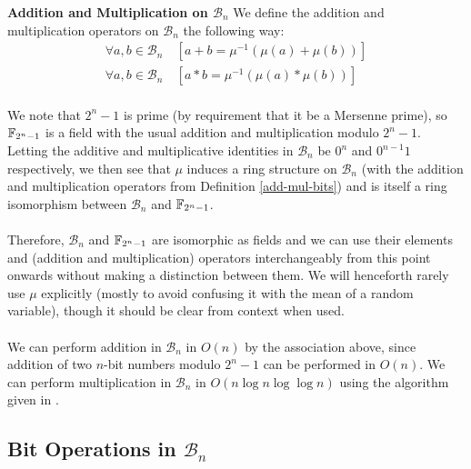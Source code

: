 \theoremstyle{definition}
\begin{definition}{\textbf{Addition and Multiplication on $\mathcal{B}_n$}}\label{add-mul-bits}
We define the addition and multiplication operators on $\mathcal{B}_n$ the following way:
\begin{align*}
    \forall a, b \in \mathcal{B}_n\:&[a + b = \mu^{-1}(\mu(a) + \mu(b))]\\
    \forall a, b \in \mathcal{B}_n\:&[a * b = \mu^{-1}(\mu(a) * \mu(b))]
\end{align*}
\end{definition}

\paragraph{}
We note that $2^n - 1$ is prime (by requirement that it be a Mersenne prime), so $\mathbb{F}_{2^n - 1}$ is a field with the usual addition and multiplication modulo $2^n - 1$. Letting the additive and multiplicative identities in $\mathcal{B}_n$ be $0^n$ and $0^{n-1} 1$ respectively, we then see that $\mu$ induces a ring structure on $\mathcal{B}_n$ (with the addition and multiplication operators from Definition \ref{add-mul-bits}) and is itself a ring isomorphism between $\mathcal{B}_n$ and $\mathbb{F}_{2^n - 1}$.

\paragraph{}
Therefore, $\mathcal{B}_n$ and $\mathbb{F}_{2^n - 1}$ are isomorphic as fields and we can use their elements and (addition and multiplication) operators interchangeably from this point onwards without making a distinction between them. We will henceforth rarely use $\mu$ explicitly (mostly to avoid confusing it with the mean of a random variable), though it should be clear from context when used.

\paragraph{}
We can perform addition in $\mathcal{B}_n$ in $O(n)$ by the association above, since addition of two $n$-bit numbers modulo $2^n - 1$ can be performed in $O(n)$. We can perform multiplication in $\mathcal{B}_n$ in $O(n \log{n} \log{\log{n}})$ using the algorithm given in \cite{schonhage1971schnelle}.

\subsection{Bit Operations in $\mathcal{B}_n$}

